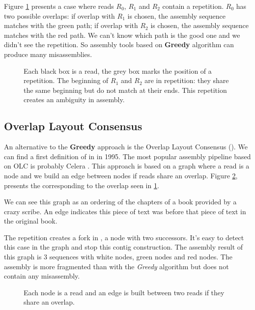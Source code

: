 \documentclass[main]{subfiles}
\begin{document}
Figure \ref{intro:fig:greedy:repetition} presents a case where reads $R_0$, $R_1$ and $R_2$ contain a repetition. $R_0$ has two possible overlaps: if overlap with $R_1$ is chosen, the assembly sequence matches with the green path; if overlap with $R_2$ is chosen, the assembly sequence matches with the red path. We can't know which path is the good one and we didn't see the repetition. So assembly tools based on \textbf{Greedy} algorithm can produce many misassemblies. 

\begin{figure}[ht]
    \centering 
    
    \caption{Each black box is a read, the grey box marks the position of a repetition. The beginning of $R_1$ and $R_2$ are in repetition: they share the same beginning but do not match at their ends. This repetition creates an ambiguity in assembly.}
    \label{intro:fig:greedy:repetition}
\end{figure}

\subsection{Overlap Layout Consensus} \label{intro:subsec:OLC}

An alternative to the \textbf{Greedy} approach is the Overlap Layout Consensus (\OLC). We can find a first definition of \OLC in \cite{OLC_myers} in 1995. The most popular assembly pipeline based on OLC is probably Celera \cite{celera_first, celera_second}. This approach is based on a graph where a read is a node and we build an edge between nodes if reads share an overlap. Figure \ref{intro:fig:olc:graph}, presents the \OLC corresponding to the overlap seen in \ref{intro:fig:greedy:repetition}.

We can see this graph as an ordering of the chapters of a book provided by a crazy scribe. An edge indicates this piece of text was before that piece of text in the original book.

The repetition creates a fork in \OLC, a node with two successors. It's easy to detect this case in the graph and stop this contig construction. The assembly result of this graph is 3 sequences with white nodes, green nodes and red nodes. The assembly is more fragmented than with the \textit{Greedy} algorithm but does not contain any misassembly.

\begin{figure}[ht]
    \centering 
    
    \caption{Each node is a read and an edge is built between two reads if they share an overlap.}
    \label{intro:fig:olc:graph}
\end{figure}
\end{document}
